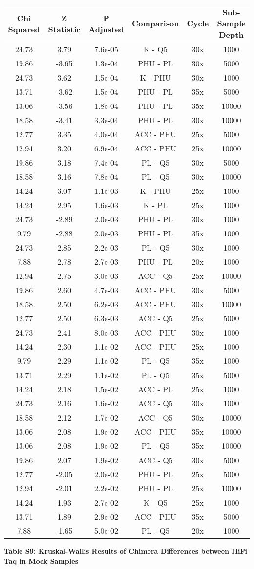 \documentclass[12pt,]{article}
\begin{document}
\begin{longtable}[]{@{}cccccc@{}}
\toprule
Chi Squared & Z Statistic & P Adjusted & Comparison & Cycle & Sub-Sample
Depth\tabularnewline
\midrule
\endhead
24.73 & 3.79 & 7.6e-05 & K - Q5 & 30x & 1000\tabularnewline
19.86 & -3.65 & 1.3e-04 & PHU - PL & 30x & 5000\tabularnewline
24.73 & 3.62 & 1.5e-04 & K - PHU & 30x & 1000\tabularnewline
13.71 & -3.62 & 1.5e-04 & PHU - PL & 35x & 5000\tabularnewline
13.06 & -3.56 & 1.8e-04 & PHU - PL & 35x & 10000\tabularnewline
18.58 & -3.41 & 3.3e-04 & PHU - PL & 30x & 10000\tabularnewline
12.77 & 3.35 & 4.0e-04 & ACC - PHU & 25x & 5000\tabularnewline
12.94 & 3.20 & 6.9e-04 & ACC - PHU & 25x & 10000\tabularnewline
19.86 & 3.18 & 7.4e-04 & PL - Q5 & 30x & 5000\tabularnewline
18.58 & 3.16 & 7.8e-04 & PL - Q5 & 30x & 10000\tabularnewline
14.24 & 3.07 & 1.1e-03 & K - PHU & 25x & 1000\tabularnewline
14.24 & 2.95 & 1.6e-03 & K - PL & 25x & 1000\tabularnewline
24.73 & -2.89 & 2.0e-03 & PHU - PL & 30x & 1000\tabularnewline
9.79 & -2.88 & 2.0e-03 & PHU - PL & 35x & 1000\tabularnewline
24.73 & 2.85 & 2.2e-03 & PL - Q5 & 30x & 1000\tabularnewline
7.88 & 2.78 & 2.7e-03 & PHU - PL & 20x & 1000\tabularnewline
12.94 & 2.75 & 3.0e-03 & ACC - Q5 & 25x & 10000\tabularnewline
19.86 & 2.60 & 4.7e-03 & ACC - PHU & 30x & 5000\tabularnewline
18.58 & 2.50 & 6.2e-03 & ACC - PHU & 30x & 10000\tabularnewline
12.77 & 2.50 & 6.3e-03 & ACC - Q5 & 25x & 5000\tabularnewline
24.73 & 2.41 & 8.0e-03 & ACC - PHU & 30x & 1000\tabularnewline
14.24 & 2.30 & 1.1e-02 & ACC - PHU & 25x & 1000\tabularnewline
9.79 & 2.29 & 1.1e-02 & PL - Q5 & 35x & 1000\tabularnewline
13.71 & 2.29 & 1.1e-02 & PL - Q5 & 35x & 5000\tabularnewline
14.24 & 2.18 & 1.5e-02 & ACC - PL & 25x & 1000\tabularnewline
24.73 & 2.16 & 1.6e-02 & ACC - Q5 & 30x & 1000\tabularnewline
18.58 & 2.12 & 1.7e-02 & ACC - Q5 & 30x & 10000\tabularnewline
13.06 & 2.08 & 1.9e-02 & ACC - PHU & 35x & 10000\tabularnewline
13.06 & 2.08 & 1.9e-02 & PL - Q5 & 35x & 10000\tabularnewline
19.86 & 2.07 & 1.9e-02 & ACC - Q5 & 30x & 5000\tabularnewline
12.77 & -2.05 & 2.0e-02 & PHU - PL & 25x & 5000\tabularnewline
12.94 & -2.01 & 2.2e-02 & PHU - PL & 25x & 10000\tabularnewline
14.24 & 1.93 & 2.7e-02 & K - Q5 & 25x & 1000\tabularnewline
13.71 & 1.89 & 2.9e-02 & ACC - PHU & 35x & 5000\tabularnewline
7.88 & -1.65 & 5.0e-02 & PL - Q5 & 20x & 1000\tabularnewline
\bottomrule
\end{longtable}

\newpage

\textbf{Table S9: Kruskal-Wallis Results of Chimera Differences between
HiFi Taq in Mock Samples}
\end{document}
